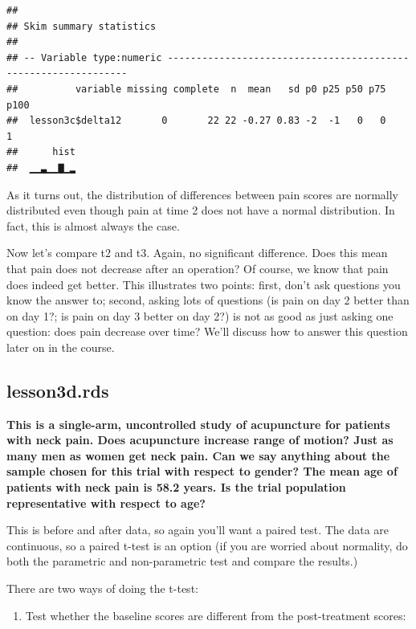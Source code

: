 \documentclass[]{book}
\providecommand{\tightlist}{%
  \setlength{\itemsep}{0pt}\setlength{\parskip}{0pt}}
\begin{document}
\begin{verbatim}
## 
## Skim summary statistics
## 
## -- Variable type:numeric ---------------------------------------------------------------
##          variable missing complete  n  mean   sd p0 p25 p50 p75 p100
##  lesson3c$delta12       0       22 22 -0.27 0.83 -2  -1   0   0    1
##      hist
##  ▁▁▃▁▁▇▁▂
\end{verbatim}

As it turns out, the distribution of differences between pain scores are
normally distributed even though pain at time 2 does not have a normal
distribution. In fact, this is almost always the case.

Now let's compare t2 and t3. Again, no significant difference. Does this
mean that pain does not decrease after an operation? Of course, we know
that pain does indeed get better. This illustrates two points: first,
don't ask questions you know the answer to; second, asking lots of
questions (is pain on day 2 better than on day 1?; is pain on day 3
better on day 2?) is not as good as just asking one question: does pain
decrease over time? We'll discuss how to answer this question later on
in the course.

\hypertarget{lesson3d.rds}{%
\subsection{lesson3d.rds}\label{lesson3d.rds}}

\textbf{This is a single-arm, uncontrolled study of acupuncture for
patients with neck pain. Does acupuncture increase range of motion? Just
as many men as women get neck pain. Can we say anything about the sample
chosen for this trial with respect to gender? The mean age of patients
with neck pain is 58.2 years. Is the trial population representative
with respect to age?}

This is before and after data, so again you'll want a paired test. The
data are continuous, so a paired t-test is an option (if you are worried
about normality, do both the parametric and non-parametric test and
compare the results.)

There are two ways of doing the t-test:

\begin{enumerate}
\def\labelenumi{\arabic{enumi})}
\tightlist
\item
  Test whether the baseline scores are different from the post-treatment
  scores:
\end{enumerate}
\end{document}
